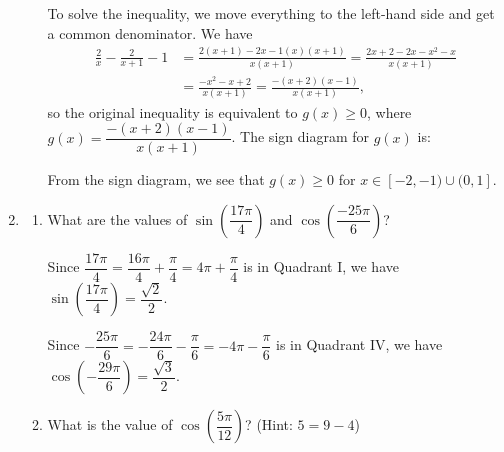 \documentclass[12pt]{article}
\newcommand{\points}[1]{\marginpar{\hspace{24pt}[#1]}}
\begin{document}
\begin{enumerate}
\begin{enumerate}
To solve the inequality, we move everything to the left-hand side and get a common denominator. We have
\begin{align*}
 \frac{2}{x}-\frac{2}{x+1}-1 &= \frac{2(x+1)-2x-1(x)(x+1)}{x(x+1)} = \frac{2x+2-2x-x^2-x}{x(x+1)}\\
& = \frac{-x^2-x+2}{x(x+1)} = \frac{-(x+2)(x-1)}{x(x+1)},
\end{align*}
so the original inequality is equivalent to $g(x)\geq 0$, where $g(x) = \dfrac{-(x+2)(x-1)}{x(x+1)}$. The sign diagram for $g(x)$ is:
\begin{center}
\end{center}
From the sign diagram, we see that $g(x)\geq 0$ for $x\in [-2,-1)\cup (0,1]$.
\end{enumerate}

\newpage

\item \begin{enumerate}
       \item What are the values of $\sin\left(\dfrac{17\pi}{4}\right)$ and $\cos\left(\dfrac{-25\pi}{6}\right)$? \points{2}

\bigskip

Since $\dfrac{17\pi}{4} = \dfrac{16\pi}{4}+\dfrac{\pi}{4} = 4\pi +\dfrac{\pi}{4}$ is in Quadrant I, we have $\sin\left(\dfrac{17\pi}{4}\right) = \dfrac{\sqrt{2}}{2}$.

\medskip

Since $-\dfrac{25\pi}{6} = -\dfrac{24\pi}{6}-\dfrac{\pi}{6} = -4\pi - \dfrac{\pi}{6}$ is in Quadrant IV, we have $\cos\left(-\dfrac{29\pi}{6}\right) = \dfrac{\sqrt{3}}{2}$.

\bigskip

 \item What is the value of $\cos\left(\dfrac{5\pi}{12}\right)$? (Hint: $5=9-4$)\points{4}

\bigskip


\end{enumerate}
\end{enumerate}
\end{document}
